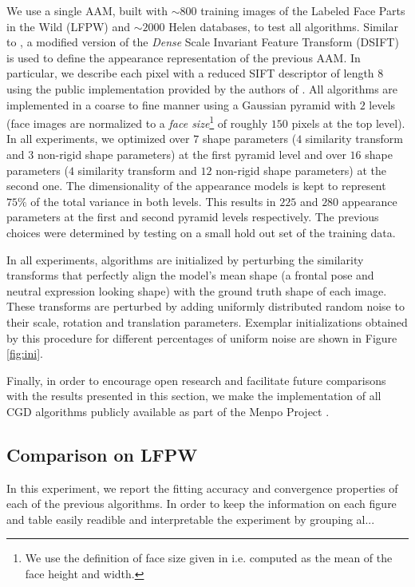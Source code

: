 We use a single AAM, built with $\sim800$ training images of the Labeled Face Parts in the Wild (LFPW) \cite{Belhumeur2011} and $\sim2000$ Helen \cite{Le2012} databases, to test all algorithms. Similar to \cite{Tzimiropoulos2014}, a modified version of the \emph{Dense} Scale Invariant Feature Transform (DSIFT) \cite{Lowe1999, Dalal2005} is used to define the appearance representation of the previous AAM. In particular, we describe each pixel with a reduced SIFT descriptor of length $8$ using the public implementation provided by the authors of \cite{Vedaldi2008vlfeat}. All algorithms are implemented in a coarse to fine manner using a Gaussian pyramid with $2$ levels (face images are normalized to a \emph{face size}\footnote{We use the definition of face size given in \cite{Zhu2012} i.e. computed as the mean of the face height and width.} of roughly $150$ pixels at the top level). In all experiments, we optimized over $7$ shape parameters ($4$ similarity transform and $3$ non-rigid shape parameters) at the first pyramid level and over $16$ shape parameters ($4$ similarity transform and $12$ non-rigid shape parameters) at the second one. The dimensionality of the appearance models is kept to represent $75\%$ of the total variance in both levels. This results in $225$ and $280$ appearance parameters at the first and second pyramid levels respectively. The previous choices were determined by testing on a small hold out set of the training data. 

In all experiments, algorithms are initialized by perturbing the similarity transforms that perfectly align the model's mean shape (a frontal pose and neutral expression looking shape) with the ground truth shape of each image. These transforms are perturbed by adding uniformly distributed random noise to their scale, rotation and translation parameters. Exemplar initializations obtained by this procedure for different percentages of uniform noise are shown in Figure \ref{fig:ini}.

Finally, in order to encourage open research and facilitate future comparisons with the results presented in this section, we make the implementation of all CGD algorithms publicly available as part of the Menpo Project \cite{Menpo2014}.

\subsection{Comparison on LFPW}

In this experiment, we report the fitting accuracy and convergence properties of each of the previous algorithms. In order to keep the information on each figure and table easily readible and interpretable the experiment by grouping al...


